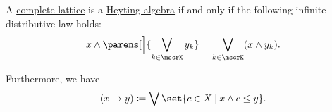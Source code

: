 \begin{proposition}\label{thm:complete_heyting_algebra}
  A \hyperref[def:complete_lattice]{complete lattice} is a \hyperref[def:heyting_algebra]{Heyting algebra} if and only if the following infinite distributive law holds:
  \begin{equation}\label{eq:thm:complete_heyting_algebra/infinite_distributive}
    x \wedge \parens[\Big]{ \bigvee_{k \in \mscrK} y_k } = \bigvee_{k \in \mscrK} (x \wedge y_k).
  \end{equation}

   Furthermore, we have
  \begin{equation}\label{eq:thm:complete_heyting_algebra/relative_pseudocomplement}
    (x \rightarrow y) \coloneqq \bigvee\set{ c \in X \given x \wedge c \leq y }.
  \end{equation}
\end{proposition}
